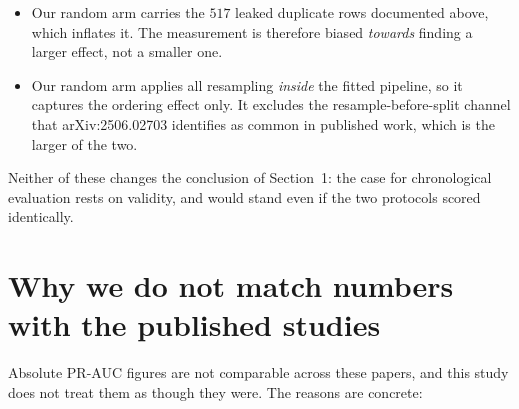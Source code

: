 \documentclass[11pt,a4paper]{article}
\begin{document}
\begin{itemize}[itemsep=2pt]
      \item Our random arm carries the $517$ leaked duplicate rows documented above, which
            inflates it. The measurement is therefore biased \emph{towards} finding a larger
            effect, not a smaller one.
      \item Our random arm applies all resampling \emph{inside} the fitted pipeline, so it
            captures the ordering effect only. It excludes the resample-before-split channel that
            arXiv:2506.02703 identifies as common in published work, which is the larger of the
            two.
\end{itemize}

\noindent Neither of these changes the conclusion of Section~1: the case for chronological
evaluation rests on validity, and would stand even if the two protocols scored identically.

\section{Why we do not match numbers with the published studies}\label{sec:nomatch}
Absolute PR-AUC figures are not comparable across these papers, and this study does not treat
them as though they were. The reasons are concrete:
\end{document}
